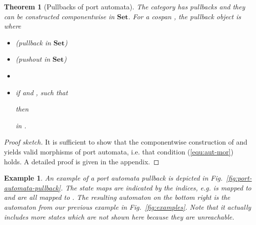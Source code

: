 \documentclass[copyright,creativecommons]{eptcs}
\newtheorem{theorem}{Theorem}
\newtheorem{example}{Example}
\newcommand{\Set}{\ensuremath{\mathbf{Set}}}
\begin{document}
\newpage
\begin{theorem}[Pullbacks of port automata]
\label{thm:pullbacks}
The category  has pullbacks and they can be constructed componentwise
in \Set. For a cospan , the pullback object
is  where\\
\begin{minipage}{0.3\textwidth}

\vspace{3mm}
\end{minipage}
\hfill
\begin{minipage}{0.65\textwidth}
\begin{itemize}
\item  (pullback in \Set)
\item  (pushout in \Set)
\item 
\item if  and ,
such that

then
	
in .
\end{itemize}
\end{minipage}
\end{theorem}
\begin{proof}[Proof sketch]
It is sufficient to show that the componentwise construction of  and
 yields valid morphisms of port automata, i.e. that
condition (\ref{equ:aut-mor}) holds. A detailed proof is
given in the appendix.
\end{proof}


\begin{example}
An example of a port automata pullback is depicted in
Fig.~\ref{fig:port-automata-pullback}. The state maps are
indicated by the indices, e.g.  is mapped to 
and  are all mapped to .
The resulting automaton on the bottom right is the automaton from
our previous example in Fig.~\ref{fig:examples}. Note that
it actually includes more states which are not shown 
here because they are unreachable.
\end{example}
\end{document}

